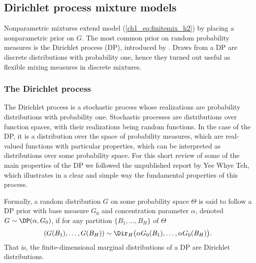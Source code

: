 \subsection{Dirichlet process mixture models}
Nonparametric mixtures extend model (\ref{ch1_eq:finitemix_h2}) by placing a nonparametric prior on $G$. The most common prior on random probability measures is the Dirichlet process (DP), introduced by \citet{ferguson1973, ferguson1974}. Draws from a DP are discrete distributions with probability one, hence they turned out useful as flexible mixing measures in discrete mixtures.

\subsubsection*{The Dirichlet process }
\label{ch1_sec:DP}
The Dirichlet process is a stochastic process whose realizations are probability distributions with probability one. 
Stochastic processes are distributions over function spaces, with their realizations being random functions. In the case of the DP, it is a distribution over the space of probability measures, which are real-valued functions with particular properties, which can be interpreted as distributions over some probability space. For this short review of some of the main properties of the DP we followed the unpublished report by Yee Whye Teh, which illustrates in a clear and simple way the fundamental properties of this process.

Formally, a random distribution $G$ on some probability space $\Theta$ is said to follow a DP prior with base measure $G_0$ and concentration parameter $\alpha$, denoted $G\sim\DP(\alpha,G_0)$, if for any partition $\{B_1,\dots,B_H\}$ of $\Theta$
\begin{equation*}
(G(B_1),\dots,G(B_H)) \sim \Dir_H\big(\alpha G_0(B_1),\dots,\alpha G_0(B_H)\big).
\end{equation*}
That is, the finite-dimensional marginal distributions of a DP are Dirichlet distributions.

